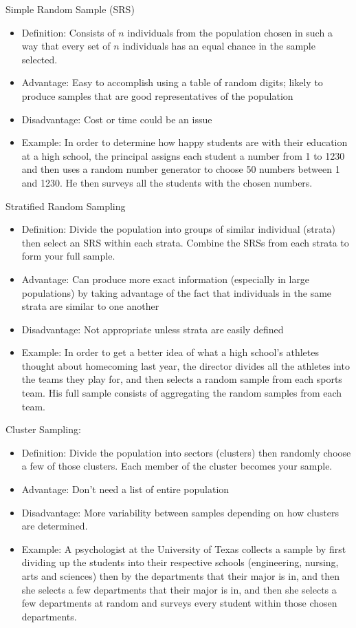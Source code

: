 \documentclass[../stats.tex]{subfiles}
\begin{document}
Simple Random Sample (SRS)
\begin{itemize}
    \item Definition: Consists of $n$ individuals from the population chosen in such a way that every set of $n$ individuals has an equal chance in the sample selected.
    \item Advantage: Easy to accomplish using a table of random digits; likely to produce samples that are good representatives of the population 
    \item Disadvantage: Cost or time could be an issue 
    \item Example: In order to determine how happy students are with their education at a high school, the principal assigns each student a number from 1 to 1230 and then uses a random number generator to choose 50 numbers between 1 and 1230. He then surveys all the students with the chosen numbers.
\end{itemize}

Stratified Random Sampling 
\begin{itemize}
    \item Definition: Divide the population into groups of similar individual (strata) then select an SRS within each strata. Combine the SRSs from each strata to form your full sample.
    \item Advantage: Can produce more exact information (especially in large populations) by taking advantage of the fact that individuals in the same strata are similar to one another 
    \item Disadvantage: Not appropriate unless strata are easily defined 
    \item Example: In order to get a better idea of what a high school's athletes thought about homecoming last year, the director divides all the athletes into the teams they play for, and then selects a random sample from each sports team. His full sample consists of aggregating the random samples from each team.
\end{itemize}

Cluster Sampling: 
\begin{itemize}
    \item Definition: Divide the population into sectors (clusters) then randomly choose a few of those clusters. Each member of the cluster becomes your sample.
    \item Advantage: Don't need a list of entire population 
    \item Disadvantage: More variability between samples depending on how clusters are determined.
    \item Example: A psychologist at the University of Texas collects a sample by first dividing up the students into their respective schools (engineering, nursing, arts and sciences) then by the departments that their major is in, and then she selects a few departments that their major is in, and then she selects a few departments at random and surveys every student within those chosen departments.
\end{itemize}
\end{document}
